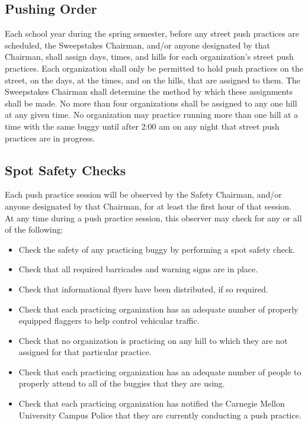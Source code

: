 \subsection{Pushing Order}

	Each school year during the spring semester, before any street push practices
	are scheduled, the Sweepstakes Chairman, and/or anyone designated by that
	Chairman, shall assign days, times, and hills for each organization's street
	push practices. Each organization shall only be permitted to hold push
	practices on the street, on the days, at the times, and on the hills, that are
	assigned to them. The Sweepstakes Chairman shall determine the method by which
	these assignments shall be made. No more than four organizations shall be
	assigned to any one hill at any given time. No organization may practice
	running more than one hill at a time with the same buggy until after 2:00 am on
	any night that street push practices are in progress.

\subsection{Spot Safety Checks}

	Each push practice session will be observed by the Safety Chairman, and/or
	anyone designated by that Chairman, for at least the first hour of that
	session. At any time during a push practice session, this observer may check
	for any or all of the following:

	\begin{itemize}

		\item Check the safety of any practicing buggy by performing a spot safety
		check.

		\item Check that all required barricades and warning signs are in place.

		\item Check that informational flyers have been distributed, if so
		required.

		\item Check that each practicing organization has an adequate number of
		properly equipped flaggers to help control vehicular traffic.

		\item Check that no organization is practicing on any hill to which they
		are not assigned for that particular practice.

		\item Check that each practicing organization has an adequate number of
		people to properly attend to all of the buggies that they are using.  \item
		Check that each practicing organization has notified the Carnegie Mellon
		University Campus Police that they are currently conducting a push practice.

	\end{itemize}


